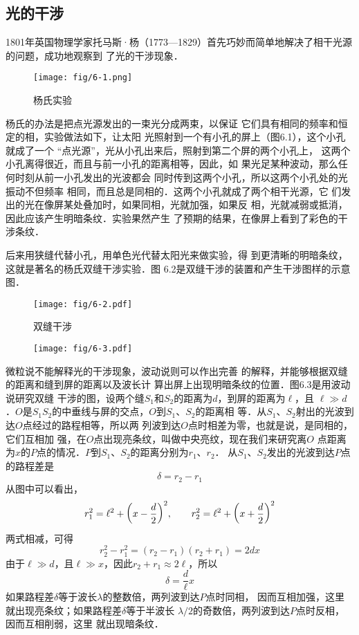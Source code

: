 \subsection{光的干涉}

1801年英国物理学家托马斯·杨（1773—1829）首先巧妙而简单地解决了相干光源的问题，成功地观察到
了光的干涉现象．
\begin{figure}[htp]\centering
    \texttt{[image: fig/6-1.png]}
    \caption{杨氏实验}
    \end{figure}

杨氏的办法是把点光源发出的一束光分成两束，以保证
它们具有相同的频率和恒定的相，实验做法如下，让太阳
光照射到一个有小孔的屏上（图6.1），这个小孔就成了一个
“点光源”，光从小孔出来后，照射到第二个屏的两个小孔上，
这两个小孔离得很近，而且与前一小孔的距离相等，因此，如
果光足某种波动，那么任何时刻从前一小孔发出的光波都会
同时传到这两个小孔，所以这两个小孔处的光振动不但频率
相同，而且总是同相的．这两个小孔就成了两个相干光源，它
们发出的光在像屏某处叠加时，如果同相，光就加强，如果反
相，光就减弱或抵消，因此应该产生明暗条纹．实验果然产生
了预期的结果，在像屏上看到了彩色的干涉条纹．

后来用狭缝代替小孔，用单色光代替太阳光来做实验，得
到更清晰的明暗条纹，这就是著名的杨氏双缝干涉实验．图
6.2是双缝干涉的装置和产生干涉图样的示意图．
\begin{figure}[htp]\centering
    \texttt{[image: fig/6-2.pdf]}
    \caption{双缝干涉}
    \end{figure}

    \begin{figure}[htp]\centering
\texttt{[image: fig/6-3.pdf]}
\caption{}
\end{figure}
微粒说不能解释光的干涉现象，波动说则可以作出完善
的解释，并能够根据双缝的距离和缝到屏的距离以及波长计
算出屏上出现明暗条纹的位置．图6.3是用波动说研究双缝
干涉的图，设两个缝$S_1$和$S_2$的距离为$d$，到屏的距离为$\ell$，且
$\ell\gg d$．$O$是$S_1S_2$的中垂线与屏的交点，$O$到$S_1$、$S_2$的距离相
等．从$S_1$、$S_2$射出的光波到达$O$点经过的路程相等，所以两
列波到达$O$点时相差为零，也就是说，是同相的，它们互相加
强，在$O$点出现亮条纹，叫做中央亮纹，现在我们来研究离$O$
点距离为$x$的$P$点的情况．$P$到$S_1$、$S_2$的距离分别为$r_1$、$r_2$．
从$S_1$、$S_2$发出的光波到达$P$点的路程差是
\[\delta =r_2-r_1 \]
从图中可以看出，
\[r^2_1=\ell^2+\qty(x-\frac{d}{2})^2,\qquad r^2_2=\ell^2+\qty(x+\frac{d}{2})^2  \]
两式相减，可得
\[r^2_2-r^2_1=(r_2-r_1)(r_2+r_1)=2dx\]
由于$\ell\gg d$，且$\ell\gg x$，因此$r_2+r_1\approx 2\ell$，所以
\[\delta=\frac{d}{\ell}x \]
如果路程差$\delta$等于波长$\lambda$的整数倍，两列波到达$P$点时同相，
因而互相加强，这里就出现亮条纹；如果路程差$\delta$等于半波长
$\lambda/2$的奇数倍，两列波到达$P$点时反相，因而互相削弱，这里
就出现暗条纹．


